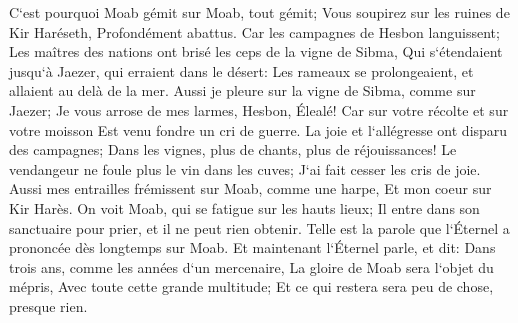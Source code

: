 \verse C`est pourquoi Moab gémit sur Moab, tout gémit; Vous soupirez sur les ruines de Kir Haréseth, Profondément abattus. 
\verse Car les campagnes de Hesbon languissent; Les maîtres des nations ont brisé les ceps de la vigne de Sibma, Qui s`étendaient jusqu`à Jaezer, qui erraient dans le désert: Les rameaux se prolongeaient, et allaient au delà de la mer. 
\verse Aussi je pleure sur la vigne de Sibma, comme sur Jaezer; Je vous arrose de mes larmes, Hesbon, Élealé! Car sur votre récolte et sur votre moisson Est venu fondre un cri de guerre. 
\verse La joie et l`allégresse ont disparu des campagnes; Dans les vignes, plus de chants, plus de réjouissances! Le vendangeur ne foule plus le vin dans les cuves; J`ai fait cesser les cris de joie. 
\verse Aussi mes entrailles frémissent sur Moab, comme une harpe, Et mon coeur sur Kir Harès. 
\verse On voit Moab, qui se fatigue sur les hauts lieux; Il entre dans son sanctuaire pour prier, et il ne peut rien obtenir. 
\verse Telle est la parole que l`Éternel a prononcée dès longtemps sur Moab. 
\verse Et maintenant l`Éternel parle, et dit: Dans trois ans, comme les années d`un mercenaire, La gloire de Moab sera l`objet du mépris, Avec toute cette grande multitude; Et ce qui restera sera peu de chose, presque rien. 

